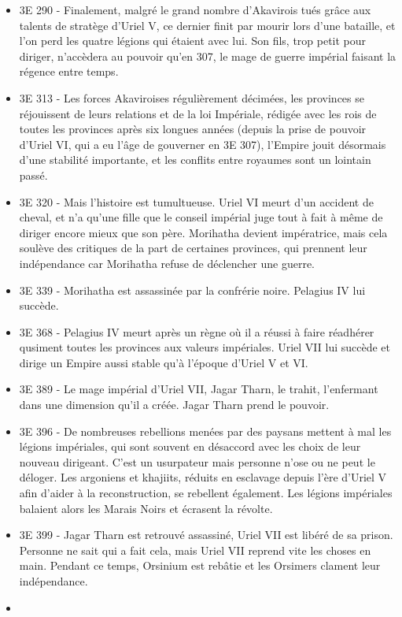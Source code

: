 \begin{itemize}
\item
3E 290 - Finalement, malgré le grand nombre d'Akavirois tués grâce aux talents de stratège d'Uriel V, ce dernier finit par mourir lors d'une bataille, et l'on perd les quatre légions qui étaient avec lui. Son fils, trop petit pour diriger, n'accèdera au pouvoir qu'en 307, le mage de guerre impérial faisant la régence entre temps.
\item
3E 313 - Les forces Akaviroises régulièrement décimées, les provinces se réjouissent de leurs relations et de la loi Impériale, rédigée avec les rois de toutes les provinces après six longues années (depuis la prise de pouvoir d'Uriel VI, qui a eu l'âge de gouverner en 3E 307), l'Empire jouit désormais d'une stabilité importante, et les conflits entre royaumes sont un lointain passé.
\item
3E 320 - Mais l'histoire est tumultueuse. Uriel VI meurt d'un accident de cheval, et n'a qu'une fille que le conseil impérial juge tout à fait à même de diriger encore mieux que son père. Morihatha devient impératrice, mais cela soulève des critiques de la part de certaines provinces, qui prennent leur indépendance car Morihatha refuse de déclencher une guerre.
\item
3E 339 - Morihatha est assassinée par la confrérie noire.  Pelagius IV lui succède.
\item
3E 368 - Pelagius IV meurt après un règne où il a réussi à faire réadhérer qusiment toutes les provinces aux valeurs impériales. Uriel VII lui succède et dirige un Empire aussi stable qu'à l'époque d'Uriel V et VI.
\item
3E 389 - Le mage impérial d'Uriel VII, Jagar Tharn, le trahit, l'enfermant dans une dimension qu'il a créée. Jagar Tharn prend le pouvoir.
\item
3E 396 - De nombreuses rebellions menées par des paysans mettent à mal les légions impériales, qui sont souvent en désaccord avec les choix de leur nouveau dirigeant. C'est un usurpateur mais personne n'ose ou ne peut le déloger. Les argoniens et khajiits, réduits en esclavage depuis l'ère d'Uriel V afin d'aider à la reconstruction, se rebellent également. Les légions impériales balaient alors les Marais Noirs et écrasent la révolte.
\item
3E 399 - Jagar Tharn est retrouvé assassiné, Uriel VII est libéré de sa prison. Personne ne sait qui a fait cela, mais Uriel VII reprend vite les choses en main. Pendant ce temps, Orsinium est rebâtie et les Orsimers clament leur indépendance.
\item

\end{itemize}
